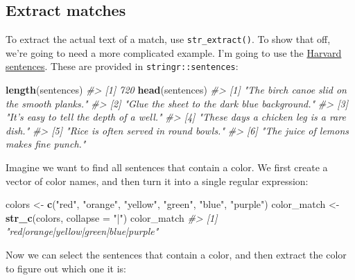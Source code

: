 \documentclass[]{book}
\newenvironment{Shaded}{\begin{snugshade}}{\end{snugshade}}
\newcommand{\KeywordTok}[1]{\textcolor[rgb]{0.13,0.29,0.53}{\textbf{#1}}}
\newcommand{\DataTypeTok}[1]{\textcolor[rgb]{0.13,0.29,0.53}{#1}}
\newcommand{\StringTok}[1]{\textcolor[rgb]{0.31,0.60,0.02}{#1}}
\newcommand{\CommentTok}[1]{\textcolor[rgb]{0.56,0.35,0.01}{\textit{#1}}}
\newcommand{\NormalTok}[1]{#1}
\begin{document}
\subsection{Extract matches}\label{extract-matches}

To extract the actual text of a match, use \texttt{str\_extract()}. To
show that off, we're going to need a more complicated example. I'm going
to use the
\href{https://en.wikipedia.org/wiki/Harvard_sentences}{Harvard
sentences}. These are provided in \texttt{stringr::sentences}:

\begin{Shaded}
\begin{Highlighting}[]
\KeywordTok{length}\NormalTok{(sentences)}
\CommentTok{#> [1] 720}
\KeywordTok{head}\NormalTok{(sentences)}
\CommentTok{#> [1] "The birch canoe slid on the smooth planks." }
\CommentTok{#> [2] "Glue the sheet to the dark blue background."}
\CommentTok{#> [3] "It's easy to tell the depth of a well."     }
\CommentTok{#> [4] "These days a chicken leg is a rare dish."   }
\CommentTok{#> [5] "Rice is often served in round bowls."       }
\CommentTok{#> [6] "The juice of lemons makes fine punch."}
\end{Highlighting}
\end{Shaded}

Imagine we want to find all sentences that contain a color. We first
create a vector of color names, and then turn it into a single regular
expression:

\begin{Shaded}
\begin{Highlighting}[]
\NormalTok{colors <-}\StringTok{ }\KeywordTok{c}\NormalTok{(}\StringTok{"red"}\NormalTok{, }\StringTok{"orange"}\NormalTok{, }\StringTok{"yellow"}\NormalTok{, }\StringTok{"green"}\NormalTok{, }\StringTok{"blue"}\NormalTok{, }\StringTok{"purple"}\NormalTok{)}
\NormalTok{color_match <-}\StringTok{ }\KeywordTok{str_c}\NormalTok{(colors, }\DataTypeTok{collapse =} \StringTok{"|"}\NormalTok{)}
\NormalTok{color_match}
\CommentTok{#> [1] "red|orange|yellow|green|blue|purple"}
\end{Highlighting}
\end{Shaded}

Now we can select the sentences that contain a color, and then extract
the color to figure out which one it is:
\end{document}
